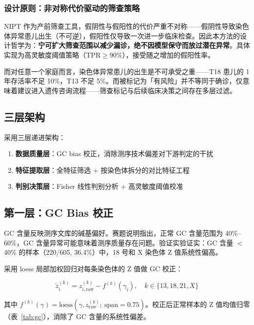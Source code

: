 \documentclass{mcm-paper}
\begin{document}
\subsubsection{设计原则：非对称代价驱动的筛查策略}

NIPT 作为产前筛查工具，假阴性与假阳性的代价严重不对称——假阴性导致染色体异常患儿出生（不可逆），假阳性仅导致一次进一步临床检查。因此本方法的设计哲学为：\textbf{宁可扩大筛查范围以减少漏诊，绝不因模型保守而放过潜在异常}。具体实现为高灵敏度阈值策略（TPR$\geq$90\%），接受随之增加的假阳性率。

而对任意一个家庭而言，染色体异常患儿的出生是不可承受之重——T18 患儿的 1 年存活率不足 10\%，T13 不足 5\%。而被标记为「有风险」并不等同于确诊，仅意味着建议进入遗传咨询流程——筛查标记与后续临床决策之间存在多层过滤。

\subsection{三层架构}

采用三层递进架构：

\begin{enumerate}
    \item \textbf{数据质量层}：GC bias 校正，消除测序技术偏差对下游判定的干扰
    \item \textbf{特征提取层}：全特征筛选 + 按染色体拆分的对比特征工程
    \item \textbf{判别决策层}：Fisher 线性判别分析 + 高灵敏度阈值校准
\end{enumerate}

\subsection{第一层：GC Bias 校正}

GC 含量反映测序文库的碱基偏好。赛题说明指出，正常 GC 含量范围为 40\%--60\%，GC 含量异常可能意味着测序质量存在问题。验证实验证实：GC 含量 $<$ 40\% 的样本（220/605, 36.4\%）中，18 号和 X 染色体 Z 值系统性偏高。

采用 loess 局部加权回归对每条染色体的 Z 值做 GC 校正：

\begin{equation}
\tilde{z}_i^{(k)} = z_{i,\text{raw}}^{(k)} - f^{(k)}(\gamma_i), \quad k \in \{13,18,21,X\}
\end{equation}

其中 $f^{(k)}(\gamma) = \text{loess}(\gamma, z^{(k)}_{\text{raw}}; \ \text{span}=0.75)$。校正后正常样本的 Z 值均值归零（表~\ref{tab:gc}），消除了 GC 含量的系统性偏差。
\end{document}
